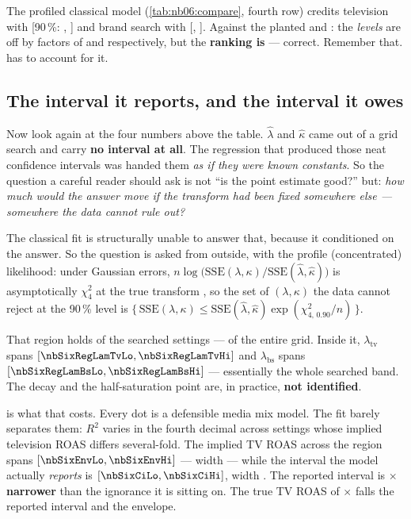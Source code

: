 

The profiled classical model (\cref{tab:nb06:compare}, fourth row) credits television with
\eur{\nbSixClContribTv} [90\,\%: \eur{\nbSixClContribTvLo}, \eur{\nbSixClContribTvHi}] and brand
search with \eur{\nbSixClContribBs} [\eur{\nbSixClContribBsLo}, \eur{\nbSixClContribBsHi}]. Against
the planted \eur{\nbSixTrueTv} and \eur{\nbSixTrueBs}: the \emph{levels} are off by factors of
\nbSixClRatioTv{} and \nbSixClRatioBs{} respectively, but the \textbf{ranking is
\nbSixClRanking} --- correct. Remember that.  has to account for it.

\subsection*{The interval it reports, and the interval it owes}

Now look again at the four numbers above the table. $\hat\lambda$ and $\hat\kappa$ came out of a
grid search and carry \textbf{no interval at all}. The regression that produced those neat
confidence intervals was handed them \emph{as if they were known constants}. So the question a
careful reader should ask is not ``is the point estimate good?'' but: \emph{how much would the
answer move if the transform had been fixed somewhere else --- somewhere the data cannot rule
out?}

The classical fit is structurally unable to answer that, because it conditioned on the answer. So
the question is asked from outside, with the profile (concentrated) likelihood: under Gaussian
errors, $n \log\big(\text{SSE}(\lambda,\kappa) / \text{SSE}(\hat\lambda,\hat\kappa)\big)$ is
asymptotically $\chi^2_4$ at the true transform \citep{vandervaart1998}, so the set of
$(\lambda, \kappa)$ the data cannot reject at the 90\,\% level is
$\{\, \text{SSE}(\lambda,\kappa) \le \text{SSE}(\hat\lambda,\hat\kappa)
\exp(\chi^2_{4,\,0.90} / n) \,\}$.

That region holds \nbSixRegN{} of the \nbSixClNGrid{} searched settings --- \pc{\nbSixRegShare} of
the entire grid. Inside it, $\lambda_{\text{tv}}$ spans
$[\nbSixRegLamTvLo, \nbSixRegLamTvHi]$ and $\lambda_{\text{bs}}$ spans
$[\nbSixRegLamBsLo, \nbSixRegLamBsHi]$ --- essentially the whole searched band. The decay and the
half-saturation point are, in practice, \textbf{not identified}.



 is what that costs. Every dot is a defensible media mix model. The fit
barely separates them: $R^2$ varies in the fourth decimal across settings whose implied television
ROAS differs several-fold. The implied TV ROAS across the region spans
$[\nbSixEnvLo, \nbSixEnvHi]$ --- width \nbSixEnvWidth{} --- while the interval the model actually
\emph{reports} is $[\nbSixCiLo, \nbSixCiHi]$, width \nbSixCiWidth. The reported interval is
\textbf{\nbSixEnvOverCi$\times$ narrower} than the ignorance it is sitting on. The true TV ROAS of
\nbSixTrueRoasTv$\times$ falls \nbSixClTruthInCi{} the reported interval and
\nbSixClTruthInEnv{} the envelope.

